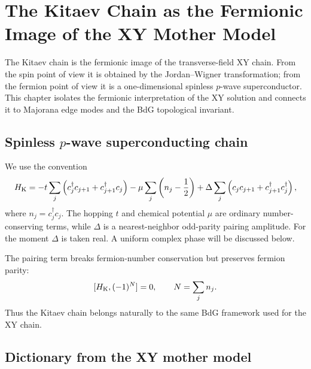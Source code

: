 \chapter{The Kitaev Chain as the Fermionic Image of the XY Mother Model}
\label{chap:kitaev-chain-fermionic-image}

The Kitaev chain is the fermionic image of the transverse-field XY chain.  From
the spin point of view it is obtained by the Jordan--Wigner transformation; from
the fermion point of view it is a one-dimensional spinless $p$-wave
superconductor.  This chapter isolates the fermionic interpretation of the XY
solution and connects it to Majorana edge modes and the BdG topological
invariant.

\section{Spinless \texorpdfstring{$p$}{p}-wave superconducting chain}
\label{sec:kitaev-p-wave-chain}

We use the convention
\begin{equation}
\label{eq:kitaev-hamiltonian}
    H_{\rm K}
    =
    -t\sum_{j}
    \left(
        c_j^\dagger c_{j+1}+c_{j+1}^\dagger c_j
    \right)
    -\mu\sum_j\left(n_j-\frac12\right)
    +\Delta\sum_j
    \left(
        c_jc_{j+1}+c_{j+1}^\dagger c_j^\dagger
    \right),
\end{equation}
where $n_j=c_j^\dagger c_j$.  The hopping $t$ and chemical potential $\mu$ are
ordinary number-conserving terms, while $\Delta$ is a nearest-neighbor odd-parity
pairing amplitude.  For the moment $\Delta$ is taken real.  A uniform complex
phase will be discussed below.

The pairing term breaks fermion-number conservation but preserves fermion parity:
\begin{equation}
\label{eq:kitaev-parity-conservation}
    [H_{\rm K},(-1)^N]=0,
    \qquad
    N=\sum_j n_j.
\end{equation}
Thus the Kitaev chain belongs naturally to the same BdG framework used for the
XY chain.

\section{Dictionary from the XY mother model}
\label{sec:kitaev-xy-dictionary}

